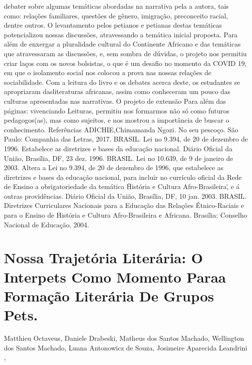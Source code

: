 debater sobre algumas temáticas abordadas na narrativa pela a autora, tais como: relações 
familiares, questões de gênero, imigração, preconceito racial, dentre outros. O levantamento pelos 
petianos e petianas destas temáticas potencializou nossas discussões, atravessando a temática 
inicial proposta. Para além de enxergar a pluralidade cultural do Continente Africano e das 
temáticas que atravessaram as discussões, e, sem sombra de dúvidas, o projeto nos permitiu criar 
laços com os novos bolsistas, o que é um desafio no momento da COVID 19, em que o isolamento 
social nos colocou a prova nas nossas relações de sociabilidade. 
Com a leitura do livro e os debates acerca deste, os estudantes se apropriaram dasliteraturas
africanas, assim como conheceram um pouco das culturas apresentadas nas narrativas. O projeto 
de extensão Para além das páginas: vivenciando Leituras, permitiu nos formarmos não só como 
futuros pedagogos(as), mas como sujeitos, e nos mostrou a importância de buscar o conhecimento. 
Referências
ADICHIE,Chimamanda Ngozi. No seu pescoço. São Paulo: Companhia das Letras, 2017. 
BRASIL. Lei no
9.394, de 20 de dezembro de 1996. Estabelece as diretrizes e bases da educação 
nacional. Diário Oficial da União, Brasília, DF, 23 dez. 1996.
BRASIL. Lei no
10.639, de 9 de janeiro de 2003. Altera a Lei no 9.394, de 20 de dezembro de 
1996, que estabelece as diretrizes e bases da educação nacional, para incluir no currículo oficial 
da Rede de Ensino a obrigatoriedade da temática \"História e Cultura Afro-Brasileira\", e á outras 
providências. Diário Oficial da União, Brasília, DF, 10 jan. 2003.
BRASIL. Diretrizes Curriculares Nacionais para a Educação das Relações Étnico-Raciais e 
para o Ensino de História e Cultura Afro-Brasileira e Africana. Brasília: Conselho Nacional 
de Educação, 2004.




\section*{Nossa Trajetória Literária: O Interpets Como Momento Paraa Formação Literária De Grupos Pets.}

Matthieu Octaveus, Daniele Drabeski, Matheus dos Santos Machado, Wellington dos Santos Machado, Luana Antonowicz de Souza, Josimeire Aparecida Leandrini ,


